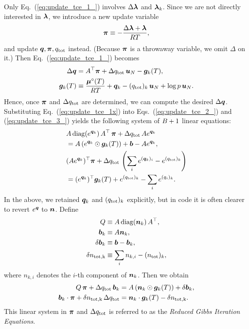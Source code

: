 Only Eq.~(\ref{eq:update_tce_1_}) involves $\Delta \boldsymbol{\lambda}$ and $\boldsymbol{\lambda}_k$. Since we are not directly interested in $\boldsymbol{\lambda}$, we introduce a new update variable
\begin{align}
    \boldsymbol{\pi} \equiv - \frac{\Delta \boldsymbol{\lambda} + \boldsymbol{\lambda}}{RT},
\end{align}
and update $\boldsymbol{q}, \boldsymbol{\pi}, q_\mathrm{tot}$ instead. (Because $\boldsymbol{\pi}$ is a throwaway variable, we omit $\Delta$ on it.) Then Eq.~(\ref{eq:update_tce_1_}) becomes
\begin{align}
\label{eq:update_tce_1x}
    \Delta \boldsymbol{q} &=  A^\top \boldsymbol{\pi} + \Delta q_\mathrm{tot} \, \boldsymbol{u}_N - \boldsymbol{g}_k(T), \\
    \boldsymbol{g}_k (T) &\equiv \frac{\boldsymbol{\mu}^\circ(T)}{RT} + {\boldsymbol{q}}_k - (q_\mathrm{tot})_k \, \boldsymbol{u}_N + \log{p} \, \boldsymbol{u}_N .
\end{align}
Hence, once $\boldsymbol{\pi}$ and $\Delta q_\mathrm{tot}$ are determined, we can compute the desired $\Delta \boldsymbol{q}$. Substituting Eq.~(\ref{eq:update_tce_1x}) into Eqs.~(\ref{eq:update_tce_2_}) and (\ref{eq:update_tce_3_}) yields the following system of $B+1$ linear equations:
\begin{align}
    &A \, \mathrm{diag} (e^{\boldsymbol{q}_k}) \, A^\top \, \boldsymbol{\pi} + \Delta q_\mathrm{tot} \, A e^{\boldsymbol{q}_k} \nonumber \\
    &= A \left(e^{\boldsymbol{q}_k} \odot \boldsymbol{g}_k (T) \right) + \boldsymbol{b} - A  e^{\boldsymbol{q}_k}, \\
    &(A  e^{\boldsymbol{q}_k})^\top \boldsymbol{\pi} + \Delta q_\mathrm{tot} \, \left( \sum_i e^{(\boldsymbol{q}_k)_i} - e^{(q_\mathrm{tot})_k} \right) \nonumber \\ 
    &= (e^{\boldsymbol{q}_k})^\top \boldsymbol{g}_k(T) + e^{(q_\mathrm{tot})_k} - \sum_i {e^{(q_i)_k}} .
\end{align}
In the above, we retained $\boldsymbol{q}_k$ and $(q_\mathrm{tot})_k$ explicitly, but in code it is often clearer to revert $e^{\boldsymbol{q}}$ to $\boldsymbol{n}$. Define
\begin{align}
    Q &\equiv  A \, \mathrm{diag} (\boldsymbol{n}_k) \, A^\top, \\
    \boldsymbol{b}_k &\equiv A \boldsymbol{n}_k, \\
    \delta \boldsymbol{b}_k &\equiv \boldsymbol{b} - \boldsymbol{b}_k, \\
     \delta n_\mathrm{tot,k} &\equiv  \sum_i n_{k,i} - (n_\mathrm{tot})_{k},
\end{align}
where $n_{k,i}$ denotes the $i$-th component of $\boldsymbol{n}_k$. Then we obtain
\begin{align}
\label{eq:rgie1}
   Q \, \boldsymbol{\pi} + \Delta q_\mathrm{tot} \, \boldsymbol{b}_k &= A \left( \boldsymbol{n}_k \odot \boldsymbol{g}_k (T) \right) + \delta \boldsymbol{b}_k, \\
\label{eq:rgie2}
\boldsymbol{b}_k \cdot \boldsymbol{\pi} + \delta n_\mathrm{tot, k} \, \Delta q_\mathrm{tot} &= \boldsymbol{n}_k \cdot \boldsymbol{g}_k(T) - \delta n_\mathrm{tot,k}.
\end{align}
This linear system in $\boldsymbol{\pi}$ and $\Delta q_\mathrm{tot}$ is referred to as the \emph{Reduced Gibbs Iteration Equations}.

